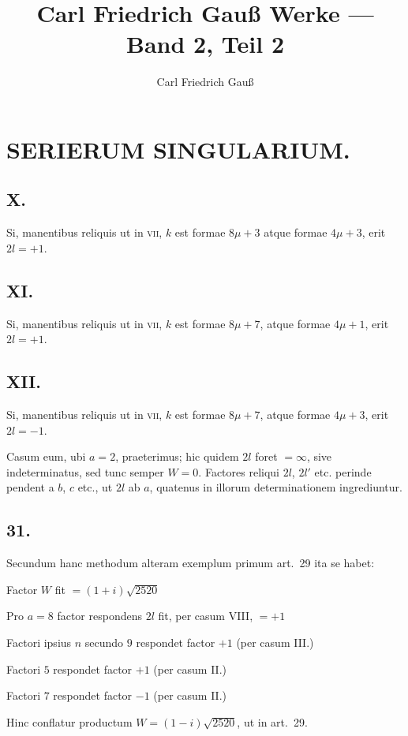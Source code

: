 \documentclass[12pt,a4paper]{article}
\title{Carl Friedrich Gau\ss{} Werke --- Band 2, Teil 2}
\author{Carl Friedrich Gau\ss}
\date{}
\theoremstyle{plain}
\theoremstyle{definition}
\theoremstyle{remark}
\begin{document}
\maketitle
\thispagestyle{empty}

\section*{SERIERUM SINGULARIUM.}


\newpage
\subsection*{X.}
Si, manentibus reliquis ut in \textsc{vii}, $k$ est formae $8\mu+3$ atque formae $4\mu+3$, erit $2l=+1$.

\subsection*{XI.}
Si, manentibus reliquis ut in \textsc{vii}, $k$ est formae $8\mu+7$, atque formae $4\mu+1$, erit $2l=+1$.

\subsection*{XII.}
Si, manentibus reliquis ut in \textsc{vii}, $k$ est formae $8\mu+7$, atque formae $4\mu+3$, erit $2l=-1$.

Casum eum, ubi $a=2$, praeterimus; hic quidem $2l$ foret $=\infty$, sive indeterminatus, sed tunc semper $W=0$. Factores reliqui $2l$, $2l'$ etc. perinde pendent a $b$, $c$ etc., ut $2l$ ab $a$, quatenus in illorum determinationem ingrediuntur.

\subsection*{31.}
Secundum hanc methodum alteram exemplum primum art.~29 ita se habet:

Factor $W$ fit $=(1+i)\sqrt{2520}$

Pro $a=8$ factor respondens $2l$ fit, per casum \textsc{VIII}, $=+1$

Factori ipsius $n$ secundo $9$ respondet factor $+1$ (per casum \textsc{III}.)

Factori $5$ respondet factor $+1$ (per casum \textsc{II}.)

Factori $7$ respondet factor $-1$ (per casum \textsc{II}.)

Hinc conflatur productum $W=(1-i)\sqrt{2520}$, ut in art.~29.
\end{document}
